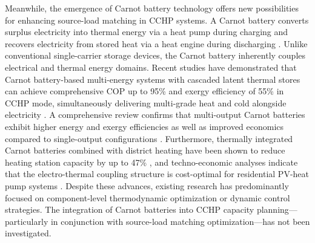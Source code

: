 Meanwhile, the emergence of Carnot battery technology offers new possibilities for enhancing source-load matching in CCHP systems. A Carnot battery converts surplus electricity into thermal energy via a heat pump during charging and recovers electricity from stored heat via a heat engine during discharging \cite{dumont2022carnot,novotny2022review}. Unlike conventional single-carrier storage devices, the Carnot battery inherently couples electrical and thermal energy domains. Recent studies have demonstrated that Carnot battery-based multi-energy systems with cascaded latent thermal stores can achieve comprehensive COP up to 95\% and exergy efficiency of 55\% in CCHP mode, simultaneously delivering multi-grade heat and cold alongside electricity \cite{zhao2024cbthermo,huang2025cbdynamic}. A comprehensive review confirms that multi-output Carnot batteries exhibit higher energy and exergy efficiencies as well as improved economics compared to single-output configurations \cite{lykas2026cbreview}. Furthermore, thermally integrated Carnot batteries combined with district heating have been shown to reduce heating station capacity by up to 47\% \cite{poletto2024cbdh}, and techno-economic analyses indicate that the electro-thermal coupling structure is cost-optimal for residential PV-heat pump systems \cite{laterre2025cbresidential}. Despite these advances, existing research has predominantly focused on component-level thermodynamic optimization or dynamic control strategies. The integration of Carnot batteries into CCHP capacity planning---particularly in conjunction with source-load matching optimization---has not been investigated.

